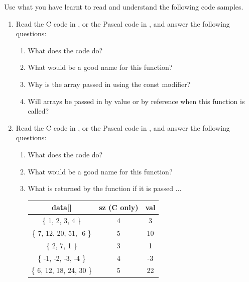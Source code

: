 Use what you have learnt to read and understand the following code samples.
\begin{enumerate}
  \item Read the C code in , or the Pascal code in , and answer the following questions:
  \begin{enumerate}
    \item What does the code do?
    \item What would be a good name for this function?
    \item Why is the array passed in using the const modifier?
    \item Will arrays be passed in by value or by reference when this function is called?
  \end{enumerate}
  \begin{figure}[h]
  \end{figure}
  \begin{figure}[h]
  \end{figure}
  
  \clearpage
  \item Read the C code in , or the Pascal code in , and answer the following questions:
  \begin{enumerate}
    \item What does the code do?
    \item What would be a good name for this function?
    \item What is returned by the function if it is passed ... 
    
    \begin{table}[h]
      \centering
      \begin{tabular}{|c|c|c|}
      \hline
       \textbf{data[]} & \textbf{sz} (C only)  & \textbf{val}  \\
       \hline 
       \{ 1, 2, 3, 4 \} & 4 & 3 \\
       \hline
       \{ 7, 12, 20, 51, -6 \} & 5 & 10 \\
       \hline
       \{ 2, 7, 1 \} & 3 & 1 \\
       \hline
       \{ -1, -2, -3, -4 \} & 4 & -3 \\
       \hline
       \{ 6, 12, 18, 24, 30 \} & 5 & 22 \\
       \hline
      \end{tabular}
    \end{table}
    

\end{enumerate}
\end{enumerate}
